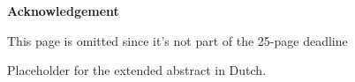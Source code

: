 \thispagestyle{empty}    %

\begin{center}
\textbf{Acknowledgement}
\end{center}
This page is omitted since it's not part of the 25-page deadline

\newpage

Placeholder for the extended abstract in Dutch.
